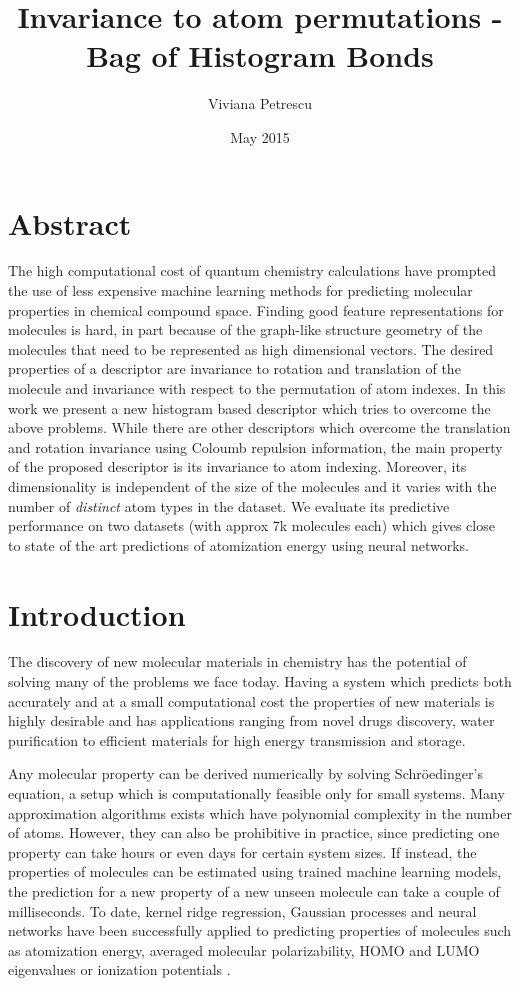 \documentclass{article}
\title{Invariance to atom permutations - Bag of Histogram Bonds}
\author{Viviana Petrescu }
\date{May 2015}
\begin{document}
\maketitle

\section{Abstract}
The high computational cost of quantum chemistry calculations have prompted the use of less expensive machine learning methods for predicting molecular properties in chemical compound space.
Finding good feature representations for molecules is hard, in part because of the graph-like structure geometry of the molecules that need to be represented as high dimensional vectors. The desired properties of a descriptor are invariance to rotation and translation of the molecule and invariance with respect to the permutation of atom indexes.
In this work we present a new histogram based descriptor which tries to overcome the above problems. While there are other descriptors which overcome the translation and rotation invariance using Coloumb repulsion information, the main property of the proposed descriptor is its invariance to atom indexing. Moreover, its dimensionality is independent of the size of the molecules and it varies with the number of \textit{distinct} atom types in the dataset.
We evaluate its predictive performance on two datasets (with approx 7k molecules each) which gives close to state of the art predictions of atomization energy using neural networks. 

\section{Introduction}
The discovery of new molecular materials in chemistry has the potential of solving many of the problems we face today.
Having a system which predicts both accurately and at a small computational cost the properties of new materials is highly desirable and has applications ranging from novel drugs discovery, water purification to efficient materials for high energy transmission and storage\cite{cleanenergy}.

Any molecular property can be derived numerically by solving Schröedinger's equation, a setup which is computationally feasible only for small systems. Many approximation algorithms exists which have polynomial complexity in the number of atoms. However, they can also be prohibitive in practice, since predicting one property can take hours or even days for certain system sizes.
If instead, the properties of molecules can be estimated using trained machine learning models, the prediction for a new property of a new unseen molecule can take a couple of milliseconds. To date, kernel ridge regression, Gaussian processes and neural networks have been successfully applied to predicting properties of molecules such as atomization energy, averaged molecular polarizability, HOMO and LUMO eigenvalues or ionization potentials \citep{assessment}.
\end{document}
